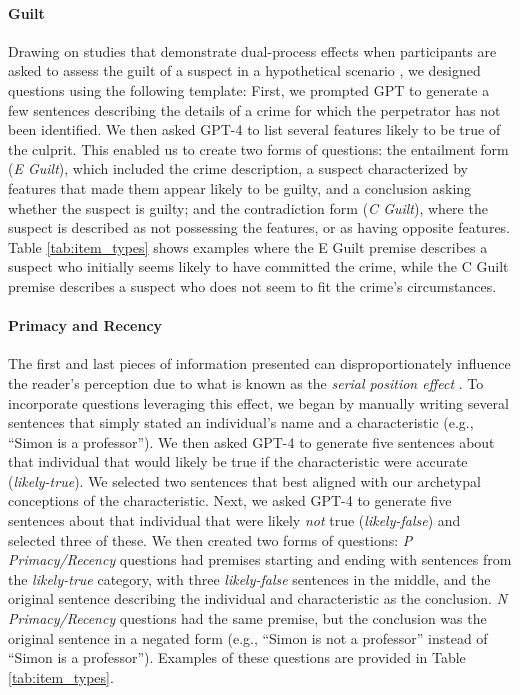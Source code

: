         \paragraph{Guilt}
        Drawing on studies that demonstrate dual-process effects when participants are asked to assess the guilt of a suspect in a hypothetical scenario \citep{Peer2013, Kassin2013, Rachlinski2015, Wistrich2015, Bergius2020}, we designed questions using the following template: First, we prompted GPT to generate a few sentences describing the details of a crime for which the perpetrator has not been identified. We then asked GPT-4 to list several features likely to be true of the culprit. This enabled us to create two forms of questions: the entailment form (\textit{E Guilt}), which included the crime description, a suspect characterized by features that made them appear likely to be guilty, and a conclusion asking whether the suspect is guilty; and the contradiction form (\textit{C Guilt}), where the suspect is described as not possessing the features, or as having opposite features. Table \ref{tab:item_types} shows examples where the E Guilt premise describes a suspect who initially seems likely to have committed the crime, while the C Guilt premise describes a suspect who does not seem to fit the crime's circumstances.

        \paragraph{Primacy and Recency} 
        The first and last pieces of information presented can disproportionately influence the reader's perception due to what is known as the \textit{serial position effect} \citep{murdock_serial_1962}. To incorporate questions leveraging this effect, we began by manually writing several sentences that simply stated an individual's name and a characteristic (e.g., ``Simon is a professor''). We then asked GPT-4 to generate five sentences about that individual that would likely be true if the characteristic were accurate (\textit{likely-true}). We selected two sentences that best aligned with our archetypal conceptions of the characteristic. Next, we asked GPT-4 to generate five sentences about that individual that were likely \textit{not} true (\textit{likely-false}) and selected three of these. We then created two forms of questions: \textit{P Primacy/Recency} questions had premises starting and ending with sentences from the \textit{likely-true} category, with three \textit{likely-false} sentences in the middle, and the original sentence describing the individual and characteristic as the conclusion. \textit{N Primacy/Recency} questions had the same premise, but the conclusion was the original sentence in a negated form (e.g., ``Simon is not a professor'' instead of ``Simon is a professor''). Examples of these questions are provided in Table \ref{tab:item_types}.

